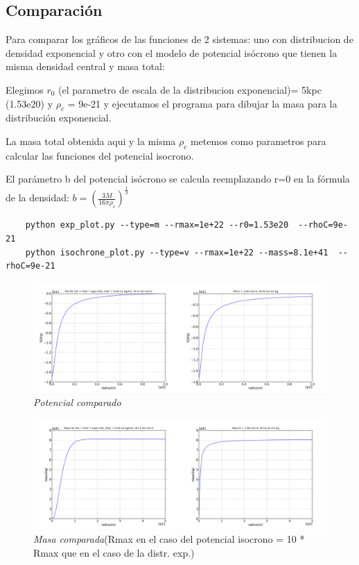 \documentclass[12pt]{book}
\begin{document}
\subsection*{Comparación}
\begin{description}
\item Para comparar los gráficos de las funciones de 2 sistemas: uno con distribucion de densidad exponencial y otro con el modelo de potencial isócrono que tienen la misma densidad central y masa total:
\item Elegimos $r_0$ (el parametro de escala de la distribucion exponencial)= 5kpc (1.53e20) y $\rho_c$ = 9e-21 y ejecutamos el programa para dibujar la masa para la distribución exponencial. 
\item La masa total obtenida aqui y la misma $\rho_c$ metemos como parametros para calcular las funciones del potencial isocrono.
\item El parámetro b del potencial isócrono se calcula reemplazando r=0 en la fórmula de la densidad: $b = (\frac{3 M}{16 \pi \rho_c})^{\frac{1}{3}}$ 
  \end{description}

\begin{verbatim}
	python exp_plot.py --type=m --rmax=1e+22 --r0=1.53e20  --rhoC=9e-21
	python isochrone_plot.py --type=v --rmax=1e+22 --mass=8.1e+41  --rhoC=9e-21
\end{verbatim}

\begin{figure}[!ht]
 \centering
 \includegraphics[scale=0.3]{potAnComp.png}
 \caption{\emph{Potencial comparado}}
\end{figure}

\begin{figure}[!ht]
 \centering
 \includegraphics[scale=0.3]{massAnComp.png}
 \caption{\emph{Masa comparada}(Rmax en el caso del potencial isocrono = 10 * Rmax que en el caso de la distr. exp.)}
\end{figure}
\end{document}
